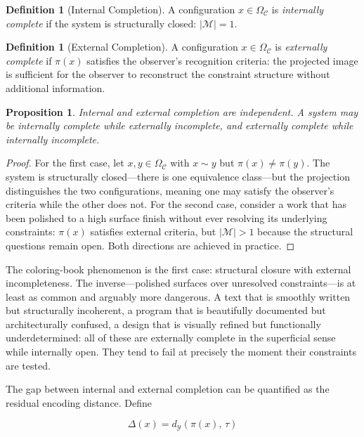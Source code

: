 \documentclass[11pt, twoside]{article}
\theoremstyle{plain}
\newtheorem{proposition}[theorem]{Proposition}
\theoremstyle{definition}
\newtheorem{definition}[theorem]{Definition}
\theoremstyle{remark}
\newcommand{\OmC}{\Omega_{\mathcal{C}}}
\begin{document}
\begin{definition}[Internal Completion]
A configuration $x \in \OmC$ is \emph{internally complete} if the system is structurally closed: $|\mathcal{M}| = 1$.
\end{definition}

\begin{definition}[External Completion]
A configuration $x \in \OmC$ is \emph{externally complete} if $\pi(x)$ satisfies the observer's recognition criteria: the projected image is sufficient for the observer to reconstruct the constraint structure without additional information.
\end{definition}

\begin{proposition}
\label{prop:noncoincidence}
Internal and external completion are independent. A system may be internally complete while externally incomplete, and externally complete while internally incomplete.
\end{proposition}

\begin{proof}
For the first case, let $x, y \in \OmC$ with $x \sim y$ but $\pi(x) \neq \pi(y)$. The system is structurally closed---there is one equivalence class---but the projection distinguishes the two configurations, meaning one may satisfy the observer's criteria while the other does not. For the second case, consider a work that has been polished to a high surface finish without ever resolving its underlying constraints: $\pi(x)$ satisfies external criteria, but $|\mathcal{M}| > 1$ because the structural questions remain open. Both directions are achieved in practice.
\end{proof}

The coloring-book phenomenon is the first case: structural closure with external incompleteness. The inverse---polished surfaces over unresolved constraints---is at least as common and arguably more dangerous. A text that is smoothly written but structurally incoherent, a program that is beautifully documented but architecturally confused, a design that is visually refined but functionally underdetermined: all of these are externally complete in the superficial sense while internally open. They tend to fail at precisely the moment their constraints are tested.

The gap between internal and external completion can be quantified as the residual encoding distance. Define

\[
\Delta(x) = d_{\mathcal{Y}}(\pi(x),\, \tau)
\]
\end{document}
